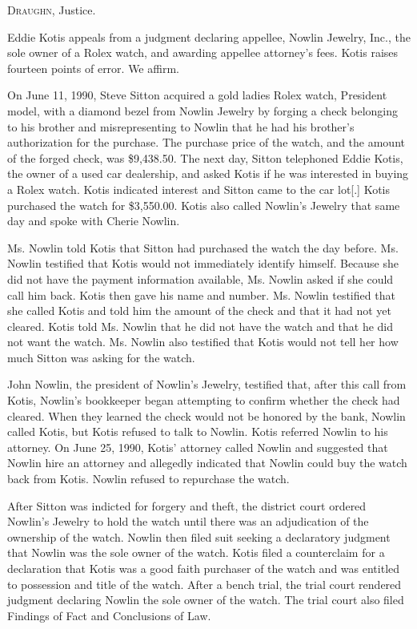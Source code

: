 
\opinion \textsc{Draughn}, Justice.

Eddie Kotis appeals from a judgment declaring appellee, Nowlin Jewelry, Inc.,
the sole owner of a Rolex watch, and awarding appellee attorney's fees. Kotis
raises fourteen points of error. We affirm.

On June 11, 1990, Steve Sitton acquired a gold ladies Rolex watch, President
model, with a diamond bezel from Nowlin Jewelry by forging a check belonging to
his brother and misrepresenting to Nowlin that he had his brother's
authorization for the purchase. The purchase price of the watch, and the amount
of the forged check, was \$9,438.50. The next day, Sitton telephoned Eddie
Kotis, the owner of a used car dealership, and asked Kotis if he was interested
in buying a Rolex watch. Kotis indicated interest and Sitton came to the car
lot[.] Kotis purchased the watch for \$3,550.00. Kotis also called Nowlin's
Jewelry that same day and spoke with Cherie Nowlin.

Ms. Nowlin told Kotis that Sitton had purchased the watch the day before. Ms.
Nowlin testified that Kotis would not immediately identify himself. Because she
did not have the payment information available, Ms. Nowlin asked if she could
call him back. Kotis then gave his name and number. Ms. Nowlin testified that
she called Kotis and told him the amount of the check and that it had not yet
cleared. Kotis told Ms. Nowlin that he did not have the watch and that he did
not want the watch. Ms. Nowlin also testified that Kotis would not tell her how
much Sitton was asking for the watch.

John Nowlin, the president of Nowlin's Jewelry, testified that, after this call
from Kotis, Nowlin's bookkeeper began attempting to confirm whether the check
had cleared. When they learned the check would not be honored by the bank,
Nowlin called Kotis, but Kotis refused to talk to Nowlin. Kotis referred Nowlin
to his attorney. On June 25, 1990, Kotis' attorney called Nowlin and suggested
that Nowlin hire an attorney and allegedly indicated that Nowlin could buy the
watch back from Kotis. Nowlin refused to repurchase the watch.

After Sitton was indicted for forgery and theft, the district court ordered
Nowlin's Jewelry to hold the watch until there was an adjudication of the
ownership of the watch. Nowlin then filed suit seeking a declaratory judgment
that Nowlin was the sole owner of the watch. Kotis filed a counterclaim for a
declaration that Kotis was a good faith purchaser of the watch and was entitled
to possession and title of the watch. After a bench trial, the trial court
rendered judgment declaring Nowlin the sole owner of the watch. The trial court
also filed Findings of Fact and Conclusions of Law.

